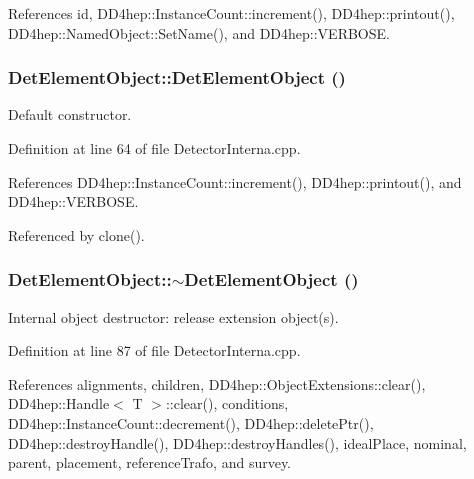 References id, DD4hep::InstanceCount::increment(), DD4hep::printout(), DD4hep::NamedObject::SetName(), and DD4hep::VERBOSE.\hypertarget{class_d_d4hep_1_1_geometry_1_1_det_element_object_ab96898101ad9db1eb508106a0b6bd6ab}{
\subsubsection[{DetElementObject}]{\setlength{\rightskip}{0pt plus 5cm}DetElementObject::DetElementObject ()}}
\label{class_d_d4hep_1_1_geometry_1_1_det_element_object_ab96898101ad9db1eb508106a0b6bd6ab}


Default constructor. 

Definition at line 64 of file DetectorInterna.cpp.

References DD4hep::InstanceCount::increment(), DD4hep::printout(), and DD4hep::VERBOSE.

Referenced by clone().\hypertarget{class_d_d4hep_1_1_geometry_1_1_det_element_object_a96c026595b89aa43a03d2406c52a778d}{
\subsubsection[{$\sim$DetElementObject}]{\setlength{\rightskip}{0pt plus 5cm}DetElementObject::$\sim$DetElementObject ()}}
\label{class_d_d4hep_1_1_geometry_1_1_det_element_object_a96c026595b89aa43a03d2406c52a778d}


Internal object destructor: release extension object(s). 

Definition at line 87 of file DetectorInterna.cpp.

References alignments, children, DD4hep::ObjectExtensions::clear(), DD4hep::Handle$<$ T $>$::clear(), conditions, DD4hep::InstanceCount::decrement(), DD4hep::deletePtr(), DD4hep::destroyHandle(), DD4hep::destroyHandles(), idealPlace, nominal, parent, placement, referenceTrafo, and survey.

